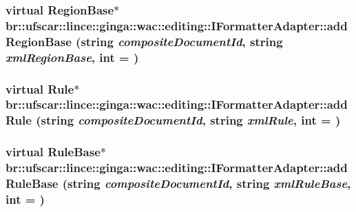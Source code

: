 \label{classbr_1_1ufscar_1_1lince_1_1ginga_1_1wac_1_1editing_1_1IFormatterAdapter_a379cbb803df82804f69730a554026081}
\hypertarget{classbr_1_1ufscar_1_1lince_1_1ginga_1_1wac_1_1editing_1_1IFormatterAdapter_abef17b93da126eef818bafdbbde2f0ab}{
\subsubsection[{addRegionBase}]{\setlength{\rightskip}{0pt plus 5cm}virtual RegionBase$\ast$ br::ufscar::lince::ginga::wac::editing::IFormatterAdapter::addRegionBase (string {\em compositeDocumentId}, \/  string {\em xmlRegionBase}, \/  int = {})}}
\label{classbr_1_1ufscar_1_1lince_1_1ginga_1_1wac_1_1editing_1_1IFormatterAdapter_abef17b93da126eef818bafdbbde2f0ab}
\hypertarget{classbr_1_1ufscar_1_1lince_1_1ginga_1_1wac_1_1editing_1_1IFormatterAdapter_aebdea3839c00805a61f5f4229e6d5f6f}{
\subsubsection[{addRule}]{\setlength{\rightskip}{0pt plus 5cm}virtual Rule$\ast$ br::ufscar::lince::ginga::wac::editing::IFormatterAdapter::addRule (string {\em compositeDocumentId}, \/  string {\em xmlRule}, \/  int = {})}}
\label{classbr_1_1ufscar_1_1lince_1_1ginga_1_1wac_1_1editing_1_1IFormatterAdapter_aebdea3839c00805a61f5f4229e6d5f6f}
\hypertarget{classbr_1_1ufscar_1_1lince_1_1ginga_1_1wac_1_1editing_1_1IFormatterAdapter_a0d65630a7f103c38c04e06c8a584ecba}{
\subsubsection[{addRuleBase}]{\setlength{\rightskip}{0pt plus 5cm}virtual RuleBase$\ast$ br::ufscar::lince::ginga::wac::editing::IFormatterAdapter::addRuleBase (string {\em compositeDocumentId}, \/  string {\em xmlRuleBase}, \/  int = {})}}
